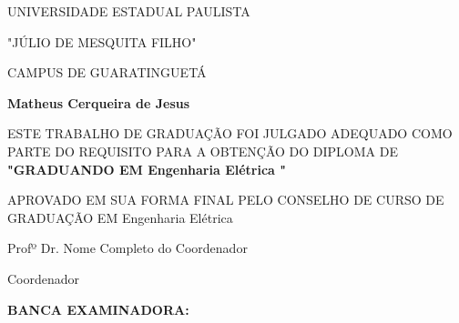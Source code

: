 \documentclass[
  12pt,		%
  a4paper,	%
  openright,%
  oneside,	%
  chapter=TITLE,		%
  section=TITLE,		%
  english,	%
  french,	%
  spanish,	%
  brazil	%
]{abntex2}
\newcommand{\nomeDoAutor}{
    Matheus Cerqueira de Jesus
    }
\newcommand{\nomeDoCurso}{
    Engenharia Elétrica
    }
\newcommand{\nomeDoCoordenador}{
    Nome Completo do Coordenador
    }
\newcommand{\tituloDoCoordenador}{
    Profº Dr.
    }
\begin{document}
    
    \imprimircapa
    \imprimirfolhaderosto
    
    \begin{folhadeaprovacao}
        \begin{center}
        
        {\sffamily
            \bfseries{
                \Large{
                    UNIVERSIDADE ESTADUAL PAULISTA\par
                    "JÚLIO DE MESQUITA FILHO"\par
                }
            }
            CAMPUS DE GUARATINGUETÁ
        }
        
        \vspace*{3cm}
                
        \normalsize{\textbf{\MakeUppercase\nomeDoAutor}}
        
        \vspace*{1cm}
        
        \begin{framed}
            ESTE TRABALHO DE GRADUAÇÃO FOI JULGADO ADEQUADO COMO PARTE DO REQUISITO PARA A OBTENÇÃO DO DIPLOMA DE \textbf{"GRADUANDO EM {\MakeUppercase\nomeDoCurso}"}
            \par
            \vspace*{1cm}
            APROVADO EM SUA FORMA FINAL PELO CONSELHO DE CURSO DE GRADUAÇÃO EM {\MakeUppercase\nomeDoCurso}
            \par
            \vspace*{1cm}
            \begin{flushright}
            \tituloDoCoordenador {\MakeUppercase\nomeDoCoordenador}
            \par
            Coordenador
            \end{flushright}
       \end{framed}
       
       \begin{flushleft}
            \textbf{BANCA EXAMINADORA:}
       \end{flushleft}
       

\end{center}
\end{folhadeaprovacao}
\end{document}
